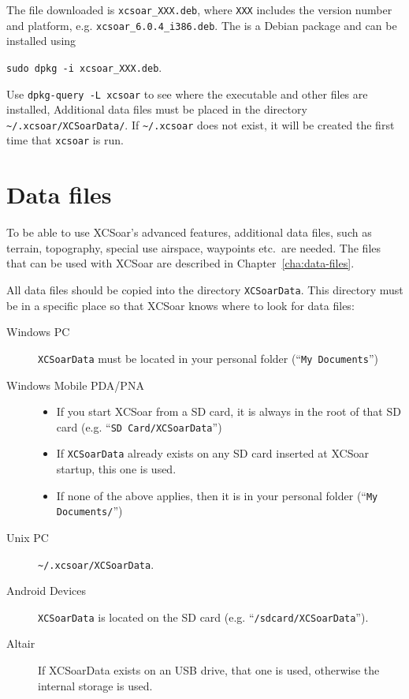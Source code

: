 The file downloaded is \verb|xcsoar_XXX.deb|, where \verb|XXX| includes
the version number and platform, e.g. \verb|xcsoar_6.0.4_i386.deb|.
The is a Debian package and can be installed using 
\begin{center}
\verb|sudo dpkg -i xcsoar_XXX.deb|.
\end{center}
Use \verb|dpkg-query -L xcsoar| to see where the executable and 
other files are installed,
Additional data files must be placed in the directory
\verb|~/.xcsoar/XCSoarData/|.
If \verb|~/.xcsoar| does not exist, it will be created the first time
that \verb|xcsoar| is run.


\section{Data files}

To be able to use XCSoar's advanced features, additional data files, such as
terrain, topography, special use airspace, waypoints etc.\ are needed. The files
that can be used with XCSoar are described in Chapter~\ref{cha:data-files}.

All data files should be copied into the directory
\texttt{XCSoarData}.  This directory must be in a specific place
so that XCSoar knows where to look for data files:

\begin{description}
\item[Windows PC]
\texttt{XCSoarData} must be located in your personal folder (``\texttt{My
Documents}'')
\item[Windows Mobile PDA/PNA]
\begin{itemize}
\item If you start XCSoar from a SD card, it is always in the root of
  that SD card (e.g. ``\texttt{SD Card/XCSoarData}'')
\item If \texttt{XCSoarData} already exists on any SD card inserted
  at XCSoar start\-up, this one is used.
\item If none of the above applies, then it is in your personal folder
  (``\texttt{My Documents/}'')
\end{itemize}
\item[Unix PC]
\verb|~/.xcsoar/XCSoarData|.
\item[Android Devices]
\texttt{XCSoarData} is located on the SD card (e.g.
``\texttt{/sdcard/XCSoarData}'').
\item[Altair]
If XCSoarData exists on an USB drive, that one is used, otherwise the
internal storage is used.
\end{description}

